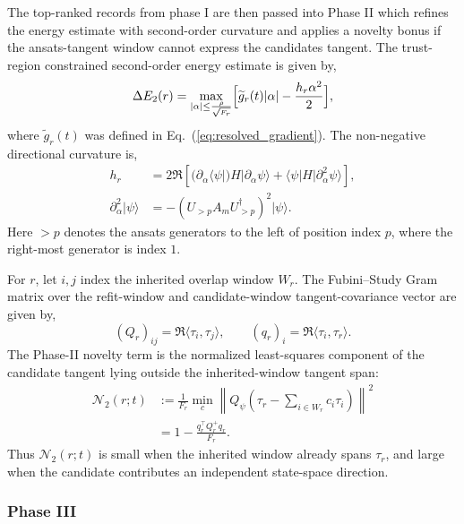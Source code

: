 \documentclass[
  reprint,
  amsmath,
  amssymb,
  aps,
  pra,
  nofootinbib,
  superscriptaddress,
  floatfix
]{revtex4-2}
\newcommand{\ket}[1]{|#1\rangle}
\begin{document}
The top-ranked records from phase I are then passed into Phase II which refines the energy estimate with second-order curvature and applies a novelty bonus if the ansats-tangent window cannot express the candidates tangent. The trust-region constrained second-order energy estimate is given by,
\begin{equation}
\Delta E_{2}(r)
=\max_{|\alpha|\le \frac{ \rho}{\sqrt{F_r}}}
\Bigl[\widetilde g_r(t)|\alpha| -\frac{h_r\alpha^2}{2}\Bigr],
\label{eq:phase2_gain}
\end{equation}
where $\widetilde g_r(t)$ was defined in Eq.~(\ref{eq:resolved_gradient}). The non-negative directional curvature is,
\begin{align}
h_r&=
2\Re\!\left[
(\partial_{\alpha}\langle \psi|)H|\partial_{\alpha}\psi\rangle
+\langle\psi|H|\partial^2_{\alpha}\psi\rangle
\right],
\label{eq:phase2_hessian}\\
\partial^2_{\alpha}\ket{\psi}
&
=-(U_{>p}A_mU_{>p}^{\dagger})^2\ket{\psi}.
\label{eq:phase2_second_derivative}
\end{align}
Here \(>p\) denotes the ansats generators to the left of position index \(p\), where the right-most generator is index \(1\).

For $r$, let $i,j$ index the inherited overlap window $W_r$. The Fubini--Study Gram matrix over the refit-window and candidate-window tangent-covariance vector are given by,
\begin{equation*}
(Q_r)_{ij}=\Re\langle\tau_i,\tau_j\rangle,
\qquad
(q_r)_i=\Re\langle\tau_i,\tau_r\rangle.
\end{equation*}
The Phase-II novelty term is the normalized least-squares component of the candidate tangent lying outside the inherited-window tangent span:
\begin{equation}
\begin{aligned}
\mathcal N_2(r;t)
&:=
\frac{1}{F_r}
\min_c
\left\|
Q_\psi\left(\tau_r-\sum_{i\in W_r}c_i\tau_i\right)
\right\|^2 \\
&=
1-
\frac{q_r^{\top}Q_r^+q_r}{F_r}.
\end{aligned}
\label{eq:phase2_novelty}
\end{equation}
Thus $\mathcal N_2(r;t)$ is small when the inherited window already spans $\tau_r$, and large when the candidate contributes an independent state-space direction.

\subsubsection{Phase III}
\end{document}
